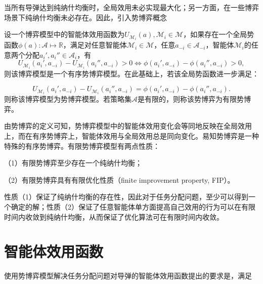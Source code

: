 当所有导弹达到纯纳什均衡时，全局效用未必实现最大化；另一方面，在一些博弈场景下纯纳什均衡未必存在。因此，引入势博弈概念

\begin{definition}[有序势博弈与势博弈]
\label{pg:def:potentialGame}
	设一个博弈模型中的智能体效用函数为$U_{\mathcal{M}_i}(a),\mathcal{M}_i\in \mathcal{M}$，如果存在一个全局势函数$\phi(a):\mathcal{A} \mapsto \mathbb{R}$，满足对任意智能体$\mathcal{M}_i \in \mathcal{M}$，任意$a_{-i}\in \mathcal{A}_{-i}$，智能体$\mathcal{M}_i$的任意两个分配$a_i',a_i''\in \mathcal{A}_i$，有
	\begin{equation}
	\label{pg:eq:ordpg}
		U_{\mathcal{M}_i}(a_i',a_{-i})-U_{\mathcal{M}_i}(a_i'',a_{-i})>0 \Leftrightarrow \phi(a_i',a_{-i})-\phi(a_i'',a_{-i})>0,
	\end{equation}
	则该博弈模型是一个有序势博弈模型。在此基础上，若该全局势函数进一步满足：
	
	\begin{equation}
	\label{pg:eq:pgdef}
		U_{\mathcal{M}_i}(a_i',a_{-i})-U_{\mathcal{M}_i}(a_i'',a_{-i})=\phi(a_i',a_{-i})-\phi(a_i'',a_{-i}).
	\end{equation}
	则称该博弈模型为势博弈模型。若策略集$\mathcal{A}$是有限的，则称该势博弈为有限势博弈。
\end{definition}

由势博弈的定义可知，势博弈模型中的智能体效用变化会等同地反映在全局效用上，而在有序势博弈上，智能体效用与全局效用总是同向变化。易知势博弈是一种特殊的有序势博弈。有限势博弈模型有两点性质：

（1）有限势博弈至少存在一个纯纳什均衡；

（2）有限势博弈具有有限优化性质（finite improvement property, FIP）。

性质（1）保证了纯纳什均衡的存在性，因此对于任务分配问题，至少可以得到一个确定的解；性质（2）保证了任意智能体单方面提高自己效用的行为可以在有限时间内收敛到纯纳什均衡，从而保证了优化算法可在有限时间内收敛。





\section{智能体效用函数}
\label{pg:wlu}


使用势博弈模型解决任务分配问题对导弹的智能体效用函数提出的要求是，满足

